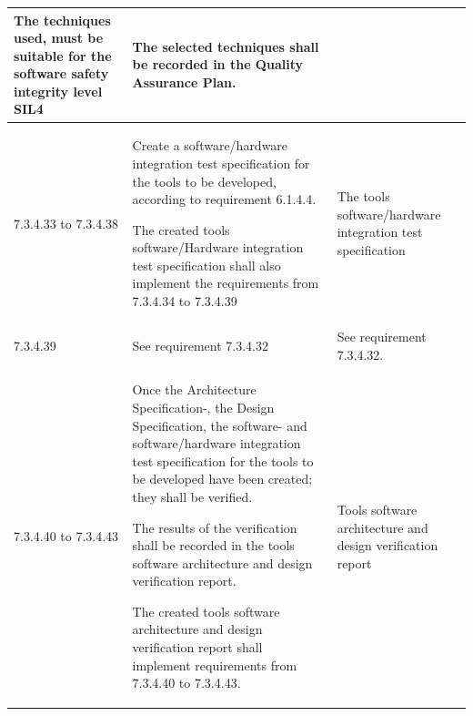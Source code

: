 \documentclass{template/openetcs_report}
\begin{document}
{\begin{longtable}{|p{2cm}|p{9cm}|p{3cm}|}
The techniques used, must be suitable for the software safety integrity level SIL4
& The selected techniques shall be recorded in the Quality Assurance Plan.\\ 
\hline
7.3.4.33 to 7.3.4.38 & Create a software/hardware integration test specification for the tools to be developed, according to requirement 6.1.4.4.

The created tools software/Hardware integration test specification shall also implement the requirements from 7.3.4.34 to 7.3.4.39
& The tools software/hardware integration test specification \\ 
\hline
7.3.4.39 & See requirement 7.3.4.32 & See requirement 7.3.4.32.\\ 
\hline
7.3.4.40 to 7.3.4.43 & Once the Architecture Specification-, the Design Specification, the software- and  software/hardware integration test specification for the tools to be developed have been created; they shall be verified.

The results of the verification shall be recorded in the tools software architecture and design verification report.

The created tools software architecture and design verification report shall implement requirements from 7.3.4.40 to 7.3.4.43.
& Tools software architecture and design verification report \\ 
\hline
\end{longtable}}
\end{document}

